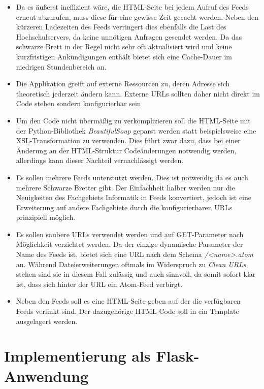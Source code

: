 \begin{itemize}
\item Da es äußerst ineffizient wäre, die HTML-Seite bei jedem Aufruf des Feeds erneut abzurufen,
muss diese für eine gewisse Zeit gecacht werden. Neben den kürzeren Ladezeiten des Feeds verringert
dies ebenfalls die Last des Hochschulservers, da keine unnötigen Anfragen gesendet werden. Da das
schwarze Brett in der Regel nicht sehr oft aktualisiert wird und keine kurzfristigen Ankündigungen
enthält bietet sich eine Cache-Dauer im niedrigen Stundenbereich an.

\item Die Applikation greift auf externe Ressourcen zu, deren Adresse sich theoretisch jederzeit
ändern kann. Externe URLs sollten daher nicht direkt im Code stehen sondern konfigurierbar sein

\item Um den Code nicht übermäßig zu verkomplizieren soll die HTML-Seite mit der Python-Bibliothek
\emph{BeautifulSoup} geparst werden statt beispielsweise eine XSL-Transformation zu verwenden. Dies
führt zwar dazu, dass bei einer Änderung an der HTML-Struktur Codeänderungen notwendig werden,
allerdings kann dieser Nachteil vernachlässigt werden.

\item Es sollen mehrere Feeds unterstützt werden. Dies ist notwendig da es auch mehrere Schwarze
Bretter gibt. Der Einfachheit halber werden nur die Neuigkeiten des Fachgebiets Informatik in Feeds
konvertiert, jedoch ist eine Erweiterung auf andere Fachgebiete durch die konfigurierbaren URLs
prinzipiell möglich.

\item Es sollen saubere URLs verwendet werden und auf GET-Parameter nach Möglichkeit verzichtet
werden. Da der einzige dynamische Parameter der Name des Feeds ist, bietet sich eine URL nach dem
Schema \emph{/<name>.atom} an. Während Dateierweiterungen oftmals im Widerspruch zu \emph{Clean
URLs} stehen sind sie in diesem Fall zulässig und auch sinnvoll, da somit sofort klar ist, dass sich
hinter der URL ein Atom-Feed verbirgt.

\item Neben den Feeds soll es eine HTML-Seite geben auf der die verfügbaren Feeds verlinkt sind. Der
dazugehörige HTML-Code soll in ein Template ausgelagert werden.
\end{itemize}

\section{Implementierung als Flask-Anwendung}

